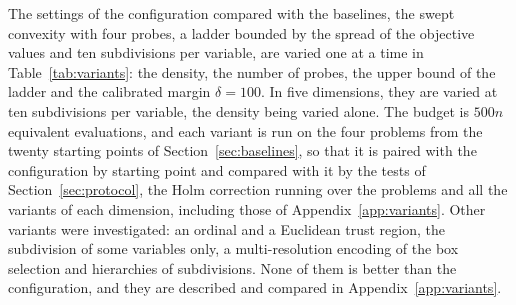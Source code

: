 \documentclass[pdflatex,sn-basic]{sn-jnl}
\begin{document}
The settings of the configuration compared with the baselines, the swept
convexity with four probes, a ladder bounded by the spread of the objective
values and ten subdivisions per variable, are varied one at a time in
Table~\ref{tab:variants}: the density, the number of probes, the upper bound of
the ladder and the calibrated margin $\delta = 100$. In five dimensions, they
are varied at ten subdivisions per variable, the density being varied alone.
The budget is $500n$ equivalent evaluations, and each variant is run on the four
problems from the twenty starting points of Section~\ref{sec:baselines}, so
that it is paired with the configuration by starting point and compared with it
by the tests of Section~\ref{sec:protocol}, the Holm correction running over the
problems and all the variants of each dimension, including those of
Appendix~\ref{app:variants}. Other variants were investigated: an ordinal and
a Euclidean trust region, the subdivision of some variables only, a
multi-resolution encoding of the box selection and hierarchies of subdivisions.
None of them is better than the configuration, and they are described and
compared in Appendix~\ref{app:variants}.
\end{document}
